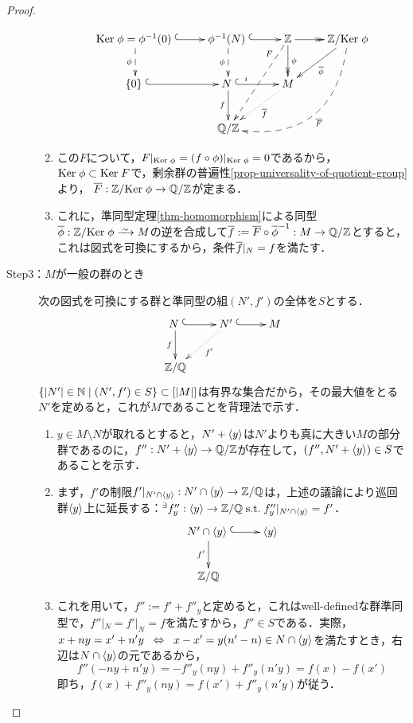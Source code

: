 \documentclass[uplatex,dvipdfmx]{jsreport}
\begin{document}
\begin{proof}
\begin{description}
\begin{enumerate}
            \[\xymatrix{
                \Ker\phi=\phi^{-1}(0) \;\ar@{^{(}->}[r]\ar@{-->}[d]_-{\phi}&\phi^{-1}(N) \;\ar@{^{(}->}[r]\ar@{-->}[d]_-{\phi}&\Z\ar@{->>}[r]\ar@{->>}[d]^-\phi\ar@{-->}[ddl]_(.2)F&\Z/\Ker\phi\ar[dl]^-{\o{\phi}}\ar@/^3pc/@{-->}[ddll]^-{\o{F}}\\
                \{0\} \;\ar@{^{(}->}[r]&N \;\ar@{^{(}->}[r]^(.3)i\ar[d]_-f&M\ar@{.>}[dl]^-{\o{f}}\\
                &\Q/\Z
            }\]
            \item この$F$について，$F|_{\mathrm{Ker}\;\phi}=(f\circ\phi)|_{\mathrm{Ker}\;\phi}=0$であるから，$\mathrm{Ker}\;\phi\subset\mathrm{Ker}\; F$で，剰余群の普遍性\ref{prop-universality-of-quotient-group}より，
            $\overline{F}:\mathbb{Z}/\mathrm{Ker}\;\phi\to\mathbb{Q}/\mathbb{Z}$が定まる．
            \item これに，準同型定理\ref{thm-homomorphism}による同型$\o{\phi}:\Z/\Ker\phi\iso M$の逆を合成して$\overline{f}:=\overline{F}\circ\overline{\phi}^{-1}:M\to\mathbb{Q}/\mathbb{Z}$とすると，これは図式を可換にするから，条件$\overline{f}|_N=f$を満たす．
        \end{enumerate}
        \item[Step3：$M$が一般の群のとき]
        次の図式を可換にする群と準同型の組$(N',f')$の全体を$S$とする．
        \[\xymatrix{
            N \;\ar@{^{(}->}[r]\ar[d]_-f&N' \;\ar@{^{(}->}[r]\ar@{.>}[dl]^-{f'}&M\\
            \Z/\Q
        }\]
        $\{\lvert N'\rvert\in\mathbb{N}\mid (N',f')\in S\}\subset[\lvert M\rvert]$は有界な集合だから，その最大値をとる$N'$を定めると，これが$M$であることを背理法で示す．
        \begin{enumerate}
            \item $y\in M\setminus N$が取れるとすると，$N'+\langle y\rangle$は$N'$よりも真に大きい$M$の部分群であるのに，$f'':N'+\langle y\rangle\to\mathbb{Q}/\mathbb{Z}$が存在して，$(f'',N'+\langle y\rangle)\in S$であることを示す．
            \item まず，$f'$の制限$f'|_{N'\cap\langle y\rangle}:N'\cap\langle y\rangle\to\mathbb{Z}/\mathbb{Q}$は，上述の議論により巡回群$\langle y\rangle$上に延長する：${}^\exists f''_y:\langle y\rangle\to\mathbb{Z}/\mathbb{Q}\;\mathrm{s.t.}\; f''_y|_{N'\cap\langle y\rangle}=f'$．
            \[\xymatrix{
                N'\cap\brac{y}\ar[d]_-{f'}\;\ar@{^{(}->}[r]&\brac{y}\\
                \Z/\Q
            }\]
            \item これを用いて，$f'':=f'+f''_y$と定めると，これはwell-definedな群準同型で，$f''|_N=f'|_N=f$を満たすから，$f''\in S$である．実際，$x+ny=x'+n'y\;\;\Leftrightarrow\;\; x-x'=y(n'-n)\in N\cap\langle y\rangle$を満たすとき，右辺は$N\cap\langle y\rangle$の元であるから，
            \[f''(-ny+n'y)=-f''_y(ny)+f''_y(n'y)=f(x)-f(x')\]
            即ち，$f(x)+f''_y(ny)=f(x')+f''_y(n'y)$が従う．
        \end{enumerate}
    \end{description}
\end{proof}
\end{document}
